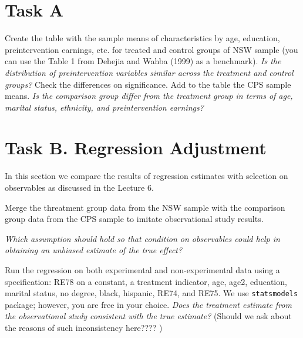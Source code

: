 \section*{Task A} 

\begin{boenumerate}

  \item Create the table with the sample means of characteristics by age, education, preintervention earnings, etc. for treated and control groups of NSW sample (you can use the Table 1 from  Dehejia and Wahba (1999) as a benchmark). \emph{Is the distribution of preintervention variables similar across the treatment and control groups?} Check the differences on significance. Add to the table the CPS sample means. \emph{Is the comparison group differ from the treatment group in terms of age, marital status, ethnicity, and preintervention earnings?}

\end{boenumerate}


\section*{Task B. Regression Adjustment}

\noindent In this section we compare the results of regression estimates with selection on observables as discussed in the Lecture 6. 

\begin{boenumerate}
  \item Merge the threatment group data from the NSW sample with the comparison group data from the CPS sample to imitate observational study results.

\item \emph{Which assumption should hold so that condition on observables could help in obtaining an unbiased estimate of the true effect?}

\item Run the regression on both experimental and non-experimental data using a specification: RE78 on a constant, a treatment indicator, age, age2, education, marital status, no degree, black, hispanic, RE74, and RE75. We use \texttt{statsmodels} package; however, you are free in your choice.  \emph{Does the treatment estimate from the observational study consistent with the true estimate?} (Should we ask about the reasons of such inconsistency here???? )

\end{boenumerate}

